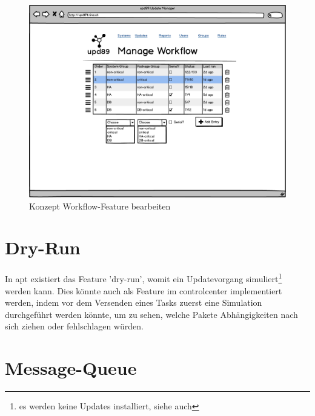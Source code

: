 \begin{figure}[H]
	\centering
	\includegraphics[width=\linewidth]{files/mockups/workflow_CRUD}
	\caption{Konzept Workflow-Feature bearbeiten}
	\label{fig:ausblick:workflow_crud}
\end{figure}


\section{Dry-Run}

In \gls{apt} existiert das Feature 'dry-run', womit ein Updatevorgang simuliert\footnote{es werden keine Updates installiert, siehe auch } werden kann. Dies könnte auch als Feature im \gls{controlcenter} implementiert werden, indem vor dem Versenden eines Tasks zuerst eine Simulation durchgeführt werden könnte, um zu sehen, welche Pakete Abhängigkeiten nach sich ziehen oder fehlschlagen würden.

\section{Message-Queue}



